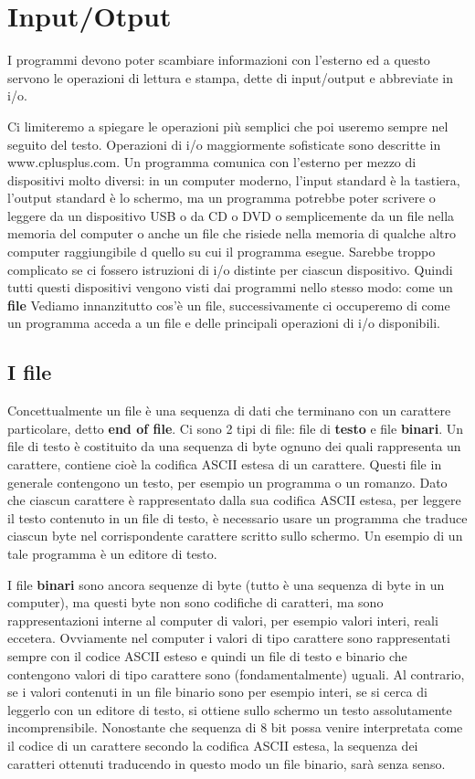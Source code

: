 \documentclass[a4paper,12pt]{book}
\begin{document}
\section{Input/Otput}
I programmi devono poter scambiare informazioni con l'esterno ed a questo servono le operazioni di lettura e stampa, dette di input/output e abbreviate in i/o.

\noindent Ci limiteremo a spiegare le operazioni più semplici che poi useremo sempre nel seguito del testo.
Operazioni di i/o maggiormente sofisticate sono descritte in www.cplusplus.com.
Un programma comunica con l'esterno per mezzo di dispositivi molto diversi: in un computer moderno, l'input standard è la tastiera, l'output standard è lo schermo, ma un programma potrebbe poter scrivere o leggere da un dispositivo USB o da CD o DVD o semplicemente da un file nella memoria del computer o anche un file che risiede nella memoria di qualche altro computer raggiungibile d quello su cui il programma esegue.
Sarebbe troppo complicato se ci fossero istruzioni di i/o distinte per ciascun dispositivo.
Quindi tutti questi dispositivi vengono visti dai programmi nello stesso modo: come un \textbf{file}
Vediamo innanzitutto cos'è un file, successivamente ci occuperemo di come un programma acceda a un file e delle principali operazioni di i/o disponibili.

\subsection{I file}
Concettualmente un file è una sequenza di dati che terminano con un carattere particolare, detto \textbf{end of file}.
Ci sono 2 tipi di file: file di \textbf{testo} e file \textbf{binari}.
Un file di testo è costituito da una sequenza di byte ognuno dei quali rappresenta un carattere, contiene cioè la codifica ASCII estesa di un carattere.
Questi file in generale contengono un testo, per esempio un programma o un romanzo.
Dato che ciascun carattere è rappresentato dalla sua codifica ASCII estesa, per leggere il testo contenuto in un file di testo, è necessario usare un programma che traduce ciascun byte nel corrispondente carattere scritto sullo schermo.
Un esempio di un tale programma è un editore di testo. 

I file \textbf{binari} sono ancora sequenze di byte (tutto è una sequenza di byte in un computer), ma questi byte non sono codifiche di caratteri, ma sono rappresentazioni interne al computer di valori, per esempio valori interi, reali eccetera.
Ovviamente nel computer i valori di tipo carattere sono rappresentati sempre con il codice ASCII esteso e quindi un file di testo e binario che contengono valori di tipo carattere sono (fondamentalmente) uguali.
Al contrario, se i valori contenuti in un file binario sono per esempio interi, se si cerca di leggerlo con un editore di testo, si ottiene sullo schermo un testo assolutamente incomprensibile.
Nonostante che sequenza di 8 bit possa venire interpretata come il codice di un carattere secondo la codifica ASCII estesa, la sequenza dei caratteri ottenuti traducendo in questo modo un file binario, sarà senza senso. 
\end{document}
